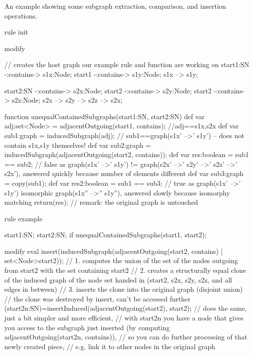 \begin{example}
An example showing some subgraph extraction, comparison, and insertion operations.
\begin{grgen}
rule init
{
	modify { // creates the host graph our example rule and function are working on
		start1:SN -:contains-> s1x:Node;
		start1    -:contains-> s1y:Node;
		s1x --> s1y;

		start2:SN -:contains-> s2x:Node;
		start2    -:contains-> s2y:Node;
		start2    -:contains-> s2z:Node;
		s2x --> s2y --> s2z --> s2x;
	}
}

function unequalContainedSubgraphs(start1:SN, start2:SN)
{
	def var adj:set<Node> = adjacentOutgoing(start1, contains); //adj=={s1x,s2x}
	def var sub1:graph = inducedSubgraph(adj); // sub1==graph(s1x' -->' s1y') -- does not contain s1x,s1y themselves!
	def var sub2:graph = inducedSubgraph(adjacentOutgoing(start2, contains));
	def var res:boolean = sub1 == sub2; // false as graph(s1x' -->' s1y') != graph(s2x' -->' s2y' -->' s2z' -->' s2x'), answered quickly because number of elements different
	def var sub3:graph = copy(sub1);
	def var res2:boolean = sub1 == sub3; // true as graph(s1x' -->' s1y') isomorphic graph(s1x'' -->'' s1y''), answered slowly because isomorphy matching
	return(res); // remark: the original graph is untouched
}

rule example
{
	start1:SN; start2:SN;
	if{ unequalContainedSubgraphs(start1, start2); }
	
	modify {
		eval {
			insert(inducedSubgraph(adjacentOutgoing(start2, contains) | set<Node>{start2}));
				// 1. computes the union of the set of the nodes outgoing from start2 with the set containing start2
				// 2. creates a structurally equal clone of the induced graph of the node set handed in (start2, s2x, s2y, s2z, and all edges in between)
				// 3. inserts the clone into the original graph (disjoint union)
				// the clone was destroyed by insert, can't be accessed further
			(start2n:SN)=insertInduced(adjacentOutgoing(start2), start2);
				// does the same, just a bit simpler and more efficient, 
				// with start2n you have a node that gives you access to the subgraph just inserted (by computing adjacentOutgoing(start2n, contains)),
				// so you can do further processing of that newly created piece,
				// e.g. link it to other nodes in the original graph
		}
	}
}
\end{grgen}
\end{example}


